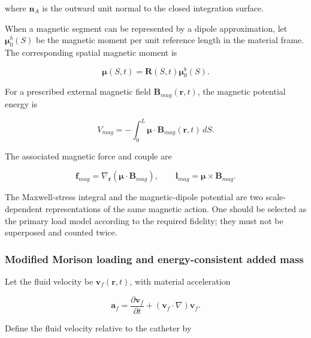 where \(\mathbf{n}_{A}\) is the outward unit normal to the closed integration surface.

When a magnetic segment can be represented by a dipole approximation, let \(\bm{\mu}_{0}^{b}(S)\) be the magnetic moment per unit reference length in the material frame. The corresponding spatial magnetic moment is\cite{Jackson1998Electrodynamics,Abbott2020MagneticRobotics}

\begin{equation}
\label{eq:rod-1-46}
\bm{\mu}(S,t) = \mathbf{R}(S,t)\bm{\mu}_{0}^{b}(S).
\end{equation}

For a prescribed external magnetic field \(\mathbf{B}_{mag}\left( \mathbf{r},t \right)\), the magnetic potential energy is

\begin{equation}
\label{eq:rod-1-47}
V_{mag} = - \int_{0}^{L}\bm{\mu} \cdot \mathbf{B}_{mag}\left( \mathbf{r},t \right)\, dS.
\end{equation}

The associated magnetic force and couple are

\begin{equation}
\label{eq:rod-1-48}
\mathbf{f}_{mag} = \nabla_{\mathbf{r}}\left( \bm{\mu} \cdot \mathbf{B}_{mag} \right),\quad\quad\mathbf{l}_{mag} = \bm{\mu} \times \mathbf{B}_{mag}.
\end{equation}

The Maxwell-stress integral and the magnetic-dipole potential are two scale-dependent representations of the same magnetic action. One should be selected as the primary load model according to the required fidelity; they must not be superposed and counted twice.

\subsubsection{Modified Morison loading and energy-consistent added mass}\label{sec:rod-1-4-4}

Let the fluid velocity be \(\mathbf{v}_{f}\left( \mathbf{r},t \right)\), with material acceleration

\begin{equation}
\label{eq:rod-1-49}
\mathbf{a}_{f} = \frac{\partial\mathbf{v}_{f}}{\partial t} + \left( \mathbf{v}_{f} \cdot \nabla \right)\mathbf{v}_{f}.
\end{equation}

Define the fluid velocity relative to the catheter by

